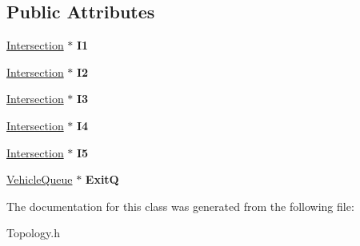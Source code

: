 \subsection*{Public Attributes}
\begin{DoxyCompactItemize}
\item 
\hypertarget{class___topology_a22e676a8a8519d5e81264facc142cd4c}{\hyperlink{class_intersection}{Intersection} $\ast$ {\bfseries I1}}\label{class___topology_a22e676a8a8519d5e81264facc142cd4c}

\item 
\hypertarget{class___topology_add9dde7506b1951f72fc82737a448f3e}{\hyperlink{class_intersection}{Intersection} $\ast$ {\bfseries I2}}\label{class___topology_add9dde7506b1951f72fc82737a448f3e}

\item 
\hypertarget{class___topology_a5853e98887c0354e46d72c66e434d835}{\hyperlink{class_intersection}{Intersection} $\ast$ {\bfseries I3}}\label{class___topology_a5853e98887c0354e46d72c66e434d835}

\item 
\hypertarget{class___topology_a6ed4a6f988c5879829337e3c819acf61}{\hyperlink{class_intersection}{Intersection} $\ast$ {\bfseries I4}}\label{class___topology_a6ed4a6f988c5879829337e3c819acf61}

\item 
\hypertarget{class___topology_a863a6dbc380236cc23cf4df6a9e24136}{\hyperlink{class_intersection}{Intersection} $\ast$ {\bfseries I5}}\label{class___topology_a863a6dbc380236cc23cf4df6a9e24136}

\item 
\hypertarget{class___topology_a6f52e458294112feaf5ef76ab457b540}{\hyperlink{class_vehicle_queue}{Vehicle\-Queue} $\ast$ {\bfseries Exit\-Q}}\label{class___topology_a6f52e458294112feaf5ef76ab457b540}

\end{DoxyCompactItemize}


The documentation for this class was generated from the following file\-:\begin{DoxyCompactItemize}
\item 
Topology.\-h\end{DoxyCompactItemize}
